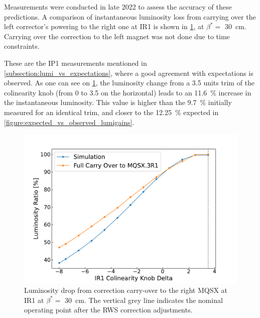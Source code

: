 Measurements were conducted in late \num{2022} to assess the accuracy of these predictions.
A comparison of instantaneous luminosity loss from carrying over the left corrector's powering to the right one at IR\num{1} is shown in \cref{figure:ir1_carry_over_vs_simulation}, at \(\beta^{\ast} =\) \qty{30}{\centi\meter}.
Carrying over the correction to the left magnet was not done due to time constraints.

\begin{noteblock}
    These are the IP\num{1} measurements mentioned in \cref{subsection:lumi_vs_expectations}, where a good agreement with expectations is observed.
    As one can see on \cref{figure:ir1_carry_over_vs_simulation}, the luminosity change from a \num{3.5} units trim of the colinearity knob (from \num{0} to \num{3.5} on the horizontal) leads to an \qty{11.6}{\percent} increase in the instantaneous luminosity.
    This value is higher than the \qty{9.7}{\percent} initially measured for an identical trim, and closer to the \qty{12.25}{\percent} expected in \cref{figure:expected_vs_observed_lumigains}.
\end{noteblock}

\begin{figure}[!htb]
    \centering
    \includegraphics*[width=\textwidth]{Figures/IR_Coupling_Correction/ir1_scan_vs_simu.pdf}
    \caption{Luminosity drop from correction carry-over to the right MQSX at IR\num{1} at \(\beta^{\ast} =\) \qty{30}{\centi\meter}. The vertical grey line indicates the nominal operating point after the RWS correction adjustments.}
    \label{figure:ir1_carry_over_vs_simulation}
\end{figure}

